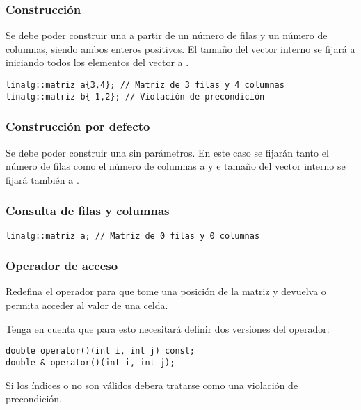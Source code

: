 \subsubsection{Construcción}

Se debe poder construir una  a partir de un número de filas y un
número de columnas, siendo ambos enteros positivos. El tamaño del vector interno
 se fijará a  iniciando todos los
elementos del vector a .

\begin{lstlisting}
linalg::matriz a{3,4}; // Matriz de 3 filas y 4 columnas
linalg::matriz b{-1,2}; // Violación de precondición
\end{lstlisting}

\subsubsection{Construcción por defecto}

Se debe poder construir una  sin parámetros. En este caso se
fijarán tanto el número de filas como el número de columnas a  y e
tamaño del vector interno  se fijará también a .

\subsubsection{Consulta de filas y columnas}

\begin{lstlisting}
linalg::matriz a; // Matriz de 0 filas y 0 columnas
\end{lstlisting}

\subsubsection{Operador de acceso}

Redefina el operador \cppid{()} para que tome una posición de la matriz y
devuelva o permita acceder al valor de una celda.

Tenga en cuenta que para esto necesitará definir dos versiones del operador:

\begin{lstlisting}
double operator()(int i, int j) const;
double & operator()(int i, int j);
\end{lstlisting}

Si los índices  o  no son válidos debera tratarse como una
violación de precondición.


